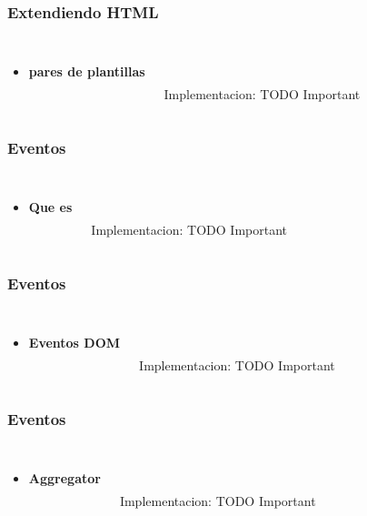 \documentclass{beamer}
\begin{document}
\begin{frame}
\frametitle{Extendiendo HTML}
\begin{columns}[c]
\begin{itemize}
\item \textbf{pares de plantillas}
\end{itemize}

\\~\\
Implementacion: TODO Important
\end{columns}
\end{frame}
\begin{frame}
\frametitle{Eventos}
\begin{columns}[c]
\begin{itemize}
\item \textbf{Que es}
\end{itemize}

\\~\\
Implementacion: TODO Important
\end{columns}
\end{frame}
\begin{frame}
\frametitle{Eventos}
\begin{columns}[c]
\begin{itemize}
\item \textbf{Eventos DOM}
\end{itemize}

\\~\\
Implementacion: TODO Important
\end{columns}
\end{frame}
\begin{frame}
\frametitle{Eventos}
\begin{columns}[c]
\begin{itemize}
\item \textbf{Aggregator}
\end{itemize}

\\~\\
Implementacion: TODO Important
\end{columns}
\end{frame}
\end{document}
